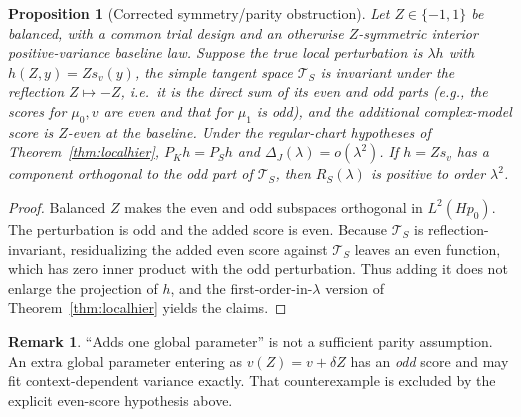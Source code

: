 \documentclass[11pt,letterpaper]{article}
\theoremstyle{plain}
\newtheorem{proposition}[theorem]{Proposition}
\theoremstyle{definition}
\newtheorem{remark}[theorem]{Remark}
\begin{document}
\begin{proposition}[Corrected symmetry/parity obstruction]\label{prop:parity}
Let $Z\in\{-1,1\}$ be balanced, with a common trial design and an otherwise $Z$-symmetric \emph{interior positive-variance} baseline law. Suppose the true local perturbation is $\lambda h$ with $h(Z,y)=Zs_v(y)$, the simple tangent space $\mathcal T_S$ is invariant under the reflection $Z\mapsto-Z$, i.e.\ it is the direct sum of its even and odd parts (e.g., the scores for $\mu_0,v$ are even and that for $\mu_1$ is odd), and \emph{the additional complex-model score is $Z$-even at the baseline}. Under the regular-chart hypotheses of Theorem~\ref{thm:localhier}, $P_Kh=P_Sh$ and $\Delta_J(\lambda)=o(\lambda^2)$. If $h=Zs_v$ has a component orthogonal to the odd part of $\mathcal T_S$, then $R_S(\lambda)$ is positive to order $\lambda^2$.
\end{proposition}
\begin{proof}
Balanced $Z$ makes the even and odd subspaces orthogonal in $L^2(Hp_0)$. The perturbation is odd and the added score is even. Because $\mathcal T_S$ is reflection-invariant, residualizing the added even score against $\mathcal T_S$ leaves an even function, which has zero inner product with the odd perturbation. Thus adding it does not enlarge the projection of $h$, and the first-order-in-$\lambda$ version of Theorem~\ref{thm:localhier} yields the claims.
\end{proof}
\begin{remark}
``Adds one global parameter'' is not a sufficient parity assumption. An extra global parameter entering as $v(Z)=v+\delta Z$ has an \emph{odd} score and may fit context-dependent variance exactly. That counterexample is excluded by the explicit even-score hypothesis above.
\end{remark}
\end{document}
